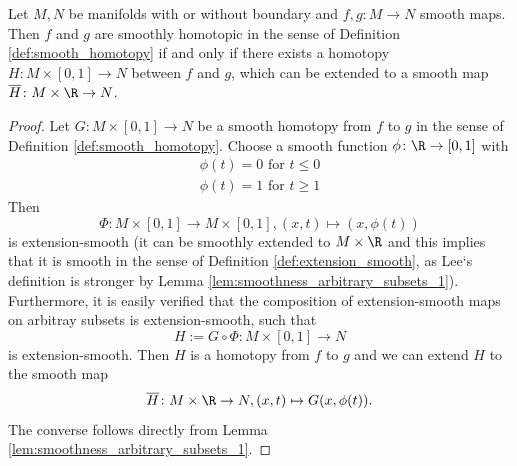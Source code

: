 \begin{lemma}
    Let $M,N$ be manifolds with or without boundary and $f,g \colon M \to N$ smooth maps. Then $f$ and $g$ are smoothly homotopic in the sense of Definition \ref{def:smooth_homotopy} if and only if there exists a homotopy $H \colon M \times [0,1] \to N$ between $f$ and $g$, which can be extended to a smooth map $\overline{H} \colon M \times \R \to N$.
\end{lemma}

\begin{proof}[Proof]
    Let $G \colon M \times [0,1] \to N$ be a smooth homotopy from $f$ to $g$ in the sense of Definition \ref{def:smooth_homotopy}. Choose a smooth function $\phi \colon \R \to [0,1]$ with
    \begin{gather*}
        \phi(t) = 0 \text{ for } t \leq 0 \\
        \phi(t) = 1 \text{ for } t \geq 1
    \end{gather*}
    Then 
    \[
        \Phi \colon M \times [0,1] \to M \times [0,1], (x,t) \mapsto (x,\phi(t))
    \]
    is extension-smooth (it can be smoothly extended to $M \times \R$ and this implies that it is smooth in the sense of Definition \ref{def:extension_smooth}, as Lee`s definition is stronger by Lemma \ref{lem:smoothness_arbitrary_subsets_1}). Furthermore, it is easily verified that the composition of extension-smooth maps on arbitray subsets is extension-smooth, such that 
    \[
    H := G \circ \Phi \colon M \times [0,1] \to N
    \] 
    is extension-smooth. Then $H$ is a homotopy from $f$ to $g$ and we can extend $H$ to the smooth map 
    \[
        \overline{H} \colon M \times \R \to N, (x,t) \mapsto G(x,\phi(t)).
    \]
    The converse follows directly from Lemma \ref{lem:smoothness_arbitrary_subsets_1}.
    
\end{proof}
